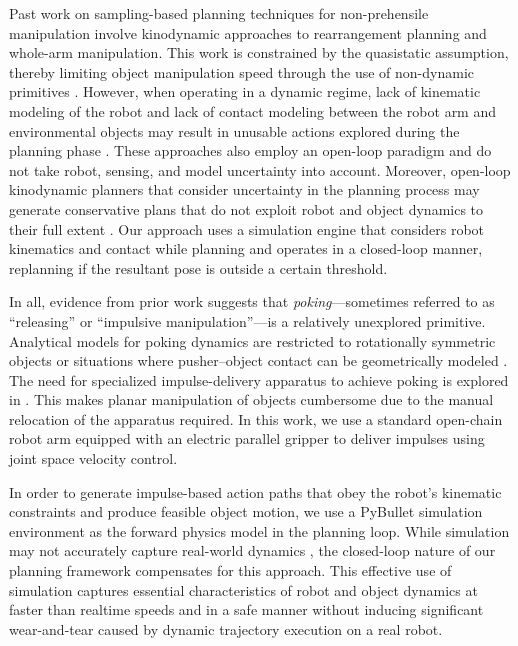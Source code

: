 Past work on sampling-based planning techniques for non-prehensile manipulation involve kinodynamic approaches to rearrangement planning and whole-arm manipulation. This work is constrained  by the quasistatic assumption, thereby limiting object manipulation speed through the use of non-dynamic primitives \cite{king2015nonprehensile}. However, when operating in a dynamic regime, lack of kinematic modeling of the robot and lack of contact modeling between the robot arm and environmental objects may result in unusable actions explored during the planning phase \cite{haustein2015kinodynamic}. These approaches also employ an open-loop paradigm and do not take robot, sensing, and model uncertainty into account. Moreover, open-loop kinodynamic planners that consider uncertainty in the planning process may generate conservative plans that do not exploit robot and object dynamics to their full extent \cite{8207585}. Our approach uses a simulation engine that considers robot kinematics and contact while planning and operates in a closed-loop manner, replanning if the resultant pose is outside a certain threshold.

In all, evidence from prior work suggests that \textsl{poking}---sometimes referred to as ``releasing'' or ``impulsive manipulation''---is a relatively unexplored primitive. Analytical models for poking dynamics are restricted to rotationally symmetric objects or situations where pusher--object contact can be geometrically modeled \cite{Huang-1997-14452, zhu2005frictional}. The need for specialized impulse-delivery apparatus to achieve poking is explored in \cite{Huang-1997-14452}. This makes planar manipulation of objects cumbersome due to the manual relocation of the apparatus required. In this work, we use a standard open-chain robot arm equipped with an electric parallel gripper to deliver impulses using joint space velocity control.

In order to generate impulse-based action paths that obey the robot's kinematic constraints and produce feasible object motion, we use a PyBullet \cite{coumans2019} simulation environment as the forward physics model in the planning loop.
While simulation may not accurately capture real-world dynamics \cite{collins2019quantifying}, the closed-loop nature of our planning framework compensates for this approach. This effective use of simulation captures essential characteristics of robot and object dynamics at faster than realtime speeds and in a safe manner without inducing significant wear-and-tear caused by dynamic trajectory execution on a real robot.
